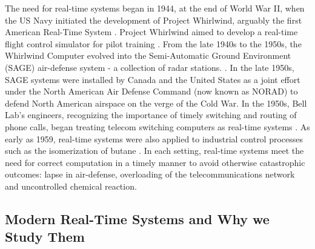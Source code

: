 The need for real-time systems began in 1944, at the end of World War II, when the US Navy initiated the development of Project Whirlwind, arguably the first American Real-Time System \cite{laplante_historical_1995}.
Project Whirlwind aimed to develop a real-time flight control simulator for pilot training \cite{forrester_whirlwind_1990}.
From the late 1940s to the 1950s, the Whirlwind Computer evolved into the Semi-Automatic Ground Environment (SAGE) air-defense system - a collection of radar stations. \cite{noauthor_tales_nodate}.
In the late 1950s, SAGE systems were installed by Canada and the United States as a joint effort under the North American Air Defense Command (now known as NORAD) to defend North American airspace on the verge of the Cold War\cite{lacomia_brief_nodate}.
In the 1950s, Bell Lab's engineers, recognizing the importance of timely switching and routing of phone calls, began treating telecom switching computers as real-time systems \cite{joel_communication_1957}.
As early as 1959, real-time systems were also applied to industrial control processes such as the isomerization of butane \cite{harrison_evolution_1981-1,stout_computer_1959}.
In each setting, real-time systems meet the need for correct computation in a timely manner to avoid otherwise catastrophic outcomes: lapse in air-defense, overloading of the telecommunications network and uncontrolled chemical reaction.

\subsection{Modern Real-Time Systems and Why we Study Them}



